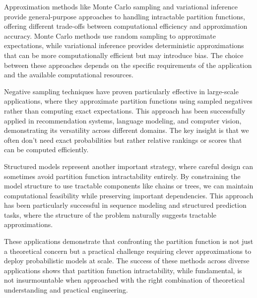 Approximation methods like Monte Carlo sampling and variational inference provide general-purpose approaches to handling intractable partition functions, offering different trade-offs between computational efficiency and approximation accuracy. Monte Carlo methods use random sampling to approximate expectations, while variational inference provides deterministic approximations that can be more computationally efficient but may introduce bias. The choice between these approaches depends on the specific requirements of the application and the available computational resources.

Negative sampling techniques have proven particularly effective in large-scale applications, where they approximate partition functions using sampled negatives rather than computing exact expectations. This approach has been successfully applied in recommendation systems, language modeling, and computer vision, demonstrating its versatility across different domains. The key insight is that we often don't need exact probabilities but rather relative rankings or scores that can be computed efficiently.

Structured models represent another important strategy, where careful design can sometimes avoid partition function intractability entirely. By constraining the model structure to use tractable components like chains or trees, we can maintain computational feasibility while preserving important dependencies. This approach has been particularly successful in sequence modeling and structured prediction tasks, where the structure of the problem naturally suggests tractable approximations.

These applications demonstrate that confronting the partition function is not just a theoretical concern but a practical challenge requiring clever approximations to deploy probabilistic models at scale. The success of these methods across diverse applications shows that partition function intractability, while fundamental, is not insurmountable when approached with the right combination of theoretical understanding and practical engineering.

